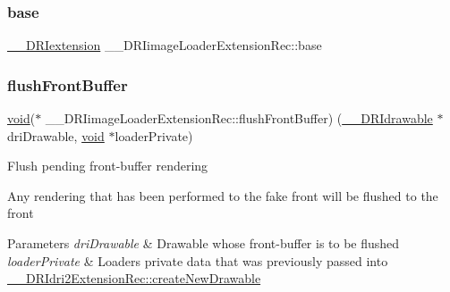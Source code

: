 \subsubsection{\texorpdfstring{base}{base}}
{\footnotesize\ttfamily \hyperlink{dri__interface_8h_a4e0a61c8ece00d2b2c6792a9a1b55385}{\+\_\+\+\_\+\+D\+R\+Iextension} \+\_\+\+\_\+\+D\+R\+Iimage\+Loader\+Extension\+Rec\+::base}

\mbox{\label{struct_____d_r_iimage_loader_extension_rec_a76ae5c894a5d4f0f201b14166b9c6a34}} 
\subsubsection{\texorpdfstring{flush\+Front\+Buffer}{flushFrontBuffer}}
{\footnotesize\ttfamily \hyperlink{_s_d_l__opengles2__gl2ext_8h_ae5d8fa23ad07c48bb609509eae494c95}{void}($\ast$ \+\_\+\+\_\+\+D\+R\+Iimage\+Loader\+Extension\+Rec\+::flush\+Front\+Buffer) (\hyperlink{dri__interface_8h_a5bfb832a0a08208d95b3bbef439d2262}{\+\_\+\+\_\+\+D\+R\+Idrawable} $\ast$dri\+Drawable, \hyperlink{_s_d_l__opengles2__gl2ext_8h_ae5d8fa23ad07c48bb609509eae494c95}{void} $\ast$loader\+Private)}

Flush pending front-\/buffer rendering

Any rendering that has been performed to the fake front will be flushed to the front


\begin{DoxyParams}{Parameters}
{\em dri\+Drawable} & Drawable whose front-\/buffer is to be flushed \\
\hline
{\em loader\+Private} & Loader\textquotesingle{}s private data that was previously passed into \hyperlink{struct_____d_r_idri2_extension_rec_a8ab2424cbe4598219f503e9e7dad2d04}{\+\_\+\+\_\+\+D\+R\+Idri2\+Extension\+Rec\+::create\+New\+Drawable} \\
\hline
\end{DoxyParams}
\mbox{\label{struct_____d_r_iimage_loader_extension_rec_a854cbf79a37003f2ea34134f9ce64c6d}} 
